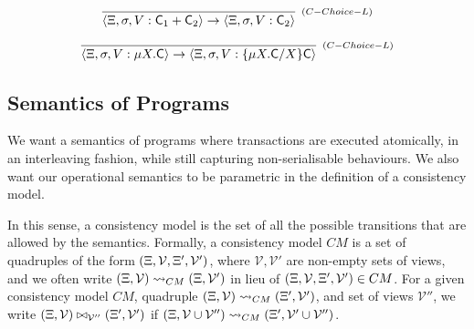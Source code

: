 \documentclass[a4paper,UKenglish]{article}%
\theoremstyle{plain}
\begin{document}
\[
\infer[{\scriptstyle{(C-Choice-L)}}]
{\langle \hh, \thdstack, V: \cmd_1 + \cmd_2 \rangle \rightarrow \langle \hh, \thdstack, V: \cmd_2 \rangle}
{} 
\]

\[
\infer[{\scriptstyle{(C-Choice-L)}}]
{\langle \hh, \thdstack, V: \mu X.\cmd \rangle \rightarrow \langle \hh, \thdstack, V: \{\mu X.\cmd/X\}\cmd \rangle}
{} 
\]

%
%
%


\subsection{Semantics of Programs}
We want a semantics of programs where transactions are 
executed atomically, in an interleaving fashion, while still capturing non-serialisable 
behaviours. We also want our operational semantics to be parametric in the definition of 
a consistency model. 

In this sense, a consistency model is the set of all the possible transitions that 
are allowed by the semantics. Formally, a consistency model $CM$ is 
a set of quadruples of the form $(\Xi, \mathcal{V}, \Xi', \mathcal{V}')$, 
where $\mathcal{V}, \mathcal{V}'$ are non-empty sets of views,
and we often write $(\Xi, \mathcal{V}) \leadsto_{CM} (\Xi, \mathcal{V}')$ 
in lieu of $(\Xi, \mathcal{V}, \Xi', \mathcal{V}') \in CM$.
For a given consistency model $CM$, quadruple $(\Xi, \mathcal{V}) 
\leadsto_{CM} (\Xi', \mathcal{V}')$,  and set of views $\mathcal{V}''$, 
we write $(\Xi, \mathcal{V}) \bowtie_{\mathcal{V}''} (\Xi', \mathcal{V}')$ 
if $(\Xi, \mathcal{V} \cup \mathcal{V}'') \leadsto_{CM} (\Xi', \mathcal{V}' \cup \mathcal{V}'')$.
\end{document}
